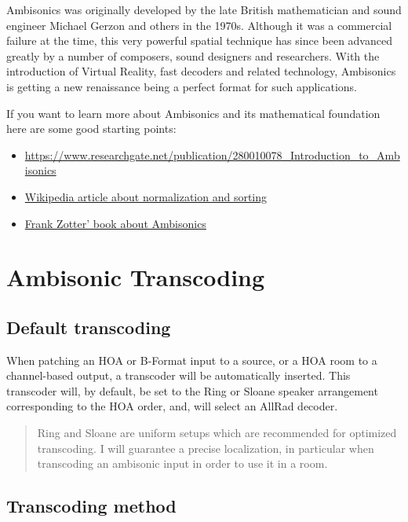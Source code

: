 \documentclass[
  letterpaper,
  DIV=11,
  numbers=noendperiod]{scrreport}
\providecommand{\tightlist}{%
  \setlength{\itemsep}{0pt}\setlength{\parskip}{0pt}}\usepackage{longtable,booktabs,array}
\begin{document}
Ambisonics was originally developed by the late British mathematician
and sound engineer Michael Gerzon and others in the 1970s. Although it
was a commercial failure at the time, this very powerful spatial
technique has since been advanced greatly by a number of composers,
sound designers and researchers. With the introduction of Virtual
Reality, fast decoders and related technology, Ambisonics is getting a
new renaissance being a perfect format for such applications.

If you want to learn more about Ambisonics and its mathematical
foundation here are some good starting points:

\begin{itemize}
\tightlist
\item
  \url{https://www.researchgate.net/publication/280010078_Introduction_to_Ambisonics}
\item
  \href{https://en.wikipedia.org/wiki/Ambisonic_data_exchange_formats}{Wikipedia
  article about normalization and sorting}
\item
  \href{https://link.springer.com/book/10.1007/978-3-030-17207-7}{Frank
  Zotter' book about Ambisonics}
\end{itemize}

\hypertarget{ambisonic-transcoding}{%
\chapter{Ambisonic Transcoding}\label{ambisonic-transcoding}}

\hypertarget{default-transcoding}{%
\section{Default transcoding}\label{default-transcoding}}

When patching an HOA or B-Format input to a source, or a HOA room to a
channel-based output, a transcoder will be automatically inserted. This
transcoder will, by default, be set to the Ring or Sloane speaker
arrangement corresponding to the HOA order, and, will select an AllRad
decoder.

\begin{quote}
Ring and Sloane are uniform setups which are recommended for optimized
transcoding. I will guarantee a precise localization, in particular when
transcoding an ambisonic input in order to use it in a room.
\end{quote}

\hypertarget{transcoding-method}{%
\section{Transcoding method}\label{transcoding-method}}
\end{document}
